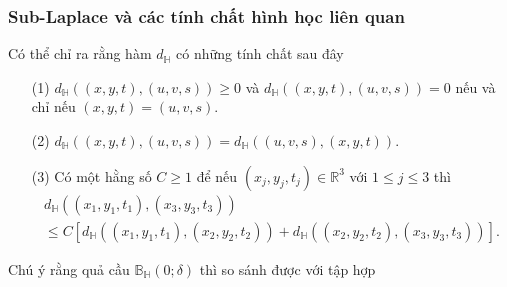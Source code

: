 \documentclass[11pt]{beamer}
\numberwithin{equation}{section}
\theoremstyle{plain}
\theoremstyle{definition}
\theoremstyle{remark}
\begin{document}
\begin{frame}\frametitle{Sub-Laplace và các tính chất hình học liên quan}
Có thể chỉ ra rằng hàm $d_\mathbb{H}$ có những tính chất sau đây
\begin{itemize}
\item[(1)] ${d_\mathbb{H}}\left( {\left( {x,y,t} \right),\left( {u,v,s} \right)} \right) \ge 0$ và ${d_\mathbb{H}}\left( {\left( {x,y,t} \right),\left( {u,v,s} \right)} \right) = 0$ nếu và chỉ nếu $\left(x,y,t\right)=\left(u,v,s\right)$.
\item[(2)] $d_{\mathbb{H}}\left(\left(x,y,t\right),\left(u,v,s\right)\right)=d_{\mathbb{H}}\left(\left(u,v,s\right),\left(x,y,t\right)\right)$.
\item[(3)] Có một hằng số $C\ge 1$ để nếu $\left( {{x_j},{y_j},{t_j}} \right) \in {\mathbb{R}^3}$ với $1\le j\le3$ thì
\[\begin{array}{l}
{d_\mathbb{H}}\left( {\left( {{x_1},{y_1},{t_1}} \right),\left( {{x_3},{y_3},{t_3}} \right)} \right)\\
 \le C\left[ {{d_\mathbb{H}}\left( {\left( {{x_1},{y_1},{t_1}} \right),\left( {{x_2},{y_2},{t_2}} \right)} \right) + {d_\mathbb{H}}\left( {\left( {{x_2},{y_2},{t_2}} \right),\left( {{x_3},{y_3},{t_3}} \right)} \right)} \right].
\end{array}\]  
\end{itemize}
Chú ý rằng quả cầu $\mathbb{B}_{\mathbb{H}}\left(0;\delta\right)$ thì so sánh được với tập hợp

\end{frame}
\end{document}
